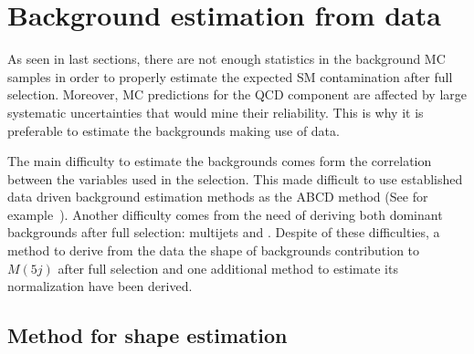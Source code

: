 \section{Background estimation from data}
\label{sec:bkg}

As seen in last sections, there are not enough statistics in the background MC samples in order to properly estimate the expected SM contamination after full selection. Moreover, MC predictions for the QCD component are affected by large systematic uncertainties that would mine their reliability. This is why it is preferable to estimate the backgrounds making use of data.

The main difficulty to estimate the backgrounds comes form the correlation between the variables used in the selection. This made difficult to use established data driven background estimation methods as the ABCD method (See for example~\cite{Khachatryan:2015axa}). Another difficulty comes from the need of deriving both dominant backgrounds after full selection: multijets and \ttbar. Despite of these difficulties, a method to derive from the data the shape of backgrounds contribution to $M(5j)$ after full selection and one additional method to estimate its normalization have been derived.

%
%
%

\subsection{Method for shape estimation}
\label{sec:bkgmet}

